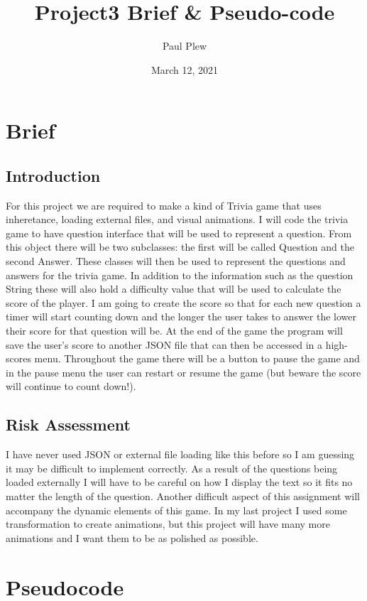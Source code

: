 \documentclass[12 pt]{report}
\title{Project3 Brief \& Pseudo-code}
\author{Paul Plew}
\date{March 12, 2021}
\begin{document}
\maketitle

\section{Brief}
\subsection{Introduction}
For this project we are required to make a kind of Trivia game that uses inheretance, loading external files, and visual animations. I will code the trivia game to have question interface that will be used to represent a question. From this object there will be two subclasses: the first will be called Question and the second Answer. These classes will then be used to represent the questions and answers for the trivia game. In addition to the information such as the question String these will also hold a difficulty value that will be used to calculate the score of the player. I am going to create the score so that for each new question a timer will start counting down and the longer the user takes to answer the lower their score for that question will be. At the end of the game the program will save the user's score to another JSON file that can then be accessed in a high-scores menu. Throughout the game there will be a button to pause the game and in the pause menu the user can restart or resume the game (but beware the score will continue to count down!).
\subsection{Risk Assessment}
I have never used JSON or external file loading like this before so I am guessing it may be difficult to implement correctly. As a result of the questions being loaded externally I will have to be careful on how I display the text so it fits no matter the length of the question. Another difficult aspect of this assignment will accompany the dynamic elements of this game. In my last project I used some transformation to create animations, but this project will have many more animations and I want them to be as polished as possible. 
\newpage
\section{Pseudocode}
\end{document}
